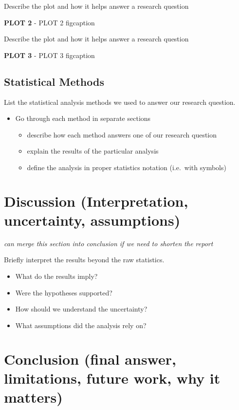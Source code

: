 \documentclass[
  american,
  11pt,
  letterpaper,
]{article}
\providecommand{\tightlist}{%
  \setlength{\itemsep}{0pt}\setlength{\parskip}{0pt}}
\begin{document}
Describe the plot and how it helps answer a research question

\textbf{PLOT 2} - PLOT 2 figcaption

Describe the plot and how it helps answer a research question

\textbf{PLOT 3} - PLOT 3 figcaption

\subsection{Statistical Methods}\label{statistical-methods}

List the statistical analysis methods we used to answer our research
question.

\begin{itemize}
\tightlist
\item
  Go through each method in separate sections

  \begin{itemize}
  \tightlist
  \item
    describe how each method answers one of our research question
  \item
    explain the results of the particular analysis
  \item
    define the analysis in proper statistics notation (i.e.~with
    symbols)
  \end{itemize}
\end{itemize}

\section{Discussion (Interpretation, uncertainty,
assumptions)}\label{discussion-interpretation-uncertainty-assumptions}

\emph{can merge this section into conclusion if we need to shorten the
report}

Briefly interpret the results beyond the raw statistics.

\begin{itemize}
\tightlist
\item
  What do the results imply?
\item
  Were the hypotheses supported?
\item
  How should we understand the uncertainty?
\item
  What assumptions did the analysis rely on?
\end{itemize}

\section{Conclusion (final answer, limitations, future work, why it
matters)}\label{conclusion-final-answer-limitations-future-work-why-it-matters}
\end{document}
